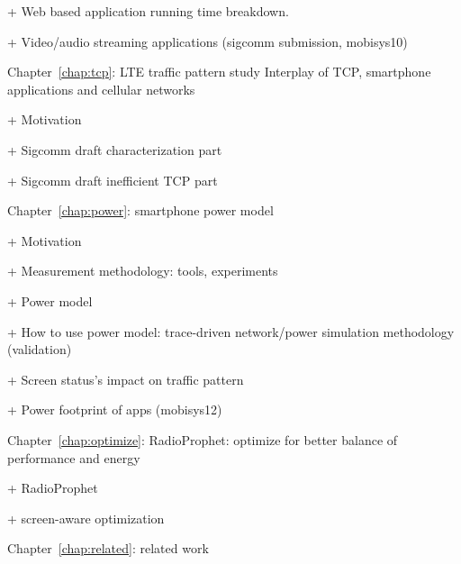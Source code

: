 	+ Web based application running time breakdown.

	+ Video/audio streaming applications (sigcomm submission, mobisys10)

	
Chapter~\ref{chap:tcp}: LTE traffic pattern study Interplay of TCP, smartphone applications and cellular networks

	+ Motivation

	+ Sigcomm draft characterization part

	+ Sigcomm draft inefficient TCP part
	
	
Chapter~\ref{chap:power}: smartphone power model

	+ Motivation

	+ Measurement methodology: tools, experiments

	+ Power model

	+ How to use power model: trace-driven network/power simulation methodology (validation)
	
	+ Screen status's impact on traffic pattern

	+ Power footprint of apps (mobisys12)
	
		
Chapter~\ref{chap:optimize}: RadioProphet: optimize for better balance of performance and energy

	+ RadioProphet

	+ screen-aware optimization
	
Chapter~\ref{chap:related}: related work

